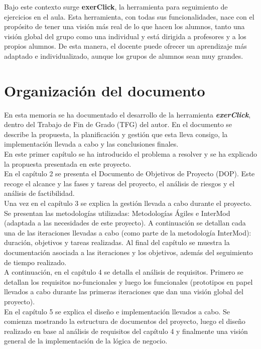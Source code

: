 Bajo este contexto surge \textbf{exerClick}, la herramienta para seguimiento de ejercicios en el aula. Esta herramienta, con todas sus funcionalidades, nace con el propósito de tener una visión más real de lo que hacen los alumnos, tanto una visión global del grupo como una individual y está dirigida a profesores y a los propios alumnos. De esta manera, el docente puede ofrecer un aprendizaje más adaptado e individualizado, aunque los grupos de alumnos sean muy grandes.\\

\section{Organización del documento}

En esta memoria se ha documentado  el desarrollo de la herramienta \textbf{\textit{exerClick}}, dentro del Trabajo de Fin de Grado (TFG) del autor. En el documento se describe la propuesta, la planificación y gestión que esta lleva consigo, la implementación llevada a cabo y las conclusiones finales.\\

En este primer capítulo se ha introducido el problema a resolver y se ha explicado la propuesta presentada en este proyecto.\\

En el capítulo 2 se presenta el Documento de Objetivos de Proyecto (DOP). Este recoge el alcance y las fases y tareas del proyecto, el análisis de riesgos y el análisis de factibilidad.\\

Una vez en el capítulo 3 se explica la gestión llevada a cabo durante el proyecto. Se presentan las metodologías utilizadas: Metodologías Ágiles e InterMod (adaptada a las necesidades de este proyecto). A continuación se detallan cada una de las iteraciones llevadas a cabo (como parte de la metodología InterMod): duración, objetivos y tareas realizadas. Al final del capítulo se muestra la documentación asociada a las iteraciones y los objetivos, además del seguimiento de tiempo realizado.\\

A continuación, en el capítulo 4 se detalla el análisis de requisitos. Primero se detallan los requisitos no-funcionales y luego los funcionales (prototipos en papel llevados a cabo durante las primeras iteraciones que dan una visión global del proyecto).\\

En el capítulo 5 se explica el diseño e implementación llevados a cabo. Se comienza mostrando la estructura de documentos del proyecto, luego el diseño realizado en base al análisis de requisitos del capítulo 4 y finalmente una visión general de la implementación de la lógica de negocio.\\

